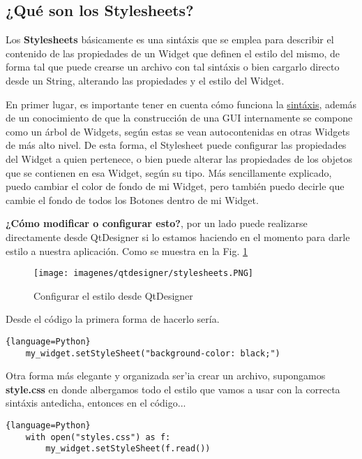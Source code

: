 \subsection{¿Qu\'e son los Stylesheets?}
\label{qt_stylesheets}
Los \textbf{Stylesheets} b\'asicamente es una sint\'axis que se emplea para describir el contenido de las propiedades
de un Widget que definen el estilo del mismo, de forma tal que puede crearse un archivo con tal sint\'axis o bien cargarlo
directo desde un String, alterando las propiedades y el estilo del Widget.

En primer lugar, es importante tener en cuenta c\'omo funciona la \href{https://doc.qt.io/qt-5/stylesheet-syntax.html}{sint\'axis},
adem\'as de un conocimiento de que la construcci\'on de una GUI internamente se compone como un \'arbol de Widgets, seg\'un estas se vean autocontenidas en otras
Widgets de m\'as alto nivel. De esta forma, el Stylesheet puede configurar las propiedades del Widget a quien pertenece, o bien puede alterar las propiedades
de los objetos que se contienen en esa Widget, seg\'un su tipo.
M\'as sencillamente explicado, puedo cambiar el color de fondo de mi Widget, pero tambi\'en puedo decirle que cambie el fondo de todos los Botones dentro de mi Widget.

\textbf{¿C\'omo modificar o configurar esto?}, por un lado puede realizarse directamente desde QtDesigner si lo estamos haciendo en el momento para darle estilo
a nuestra aplicaci\'on. Como se muestra en la Fig. \ref{fig:qt_stylesheet_image}

\begin{figure}[H]
    \centering
    \texttt{[image: imagenes/qtdesigner/stylesheets.PNG]}
    \caption{Configurar el estilo desde QtDesigner}
    \label{fig:qt_stylesheet_image}
\end{figure}

Desde el c\'odigo la primera forma de hacerlo ser\'ia.

\begin{lstlisting}{language=Python}
    my_widget.setStyleSheet("background-color: black;")
\end{lstlisting}

Otra forma m\'as elegante y organizada ser'ia crear un archivo, supongamos \textbf{style.css} en donde
albergamos todo el estilo que vamos a usar con la correcta sint\'axis antedicha, entonces en el c\'odigo...

\begin{lstlisting}{language=Python}
    with open("styles.css") as f:
        my_widget.setStyleSheet(f.read())
\end{lstlisting}
